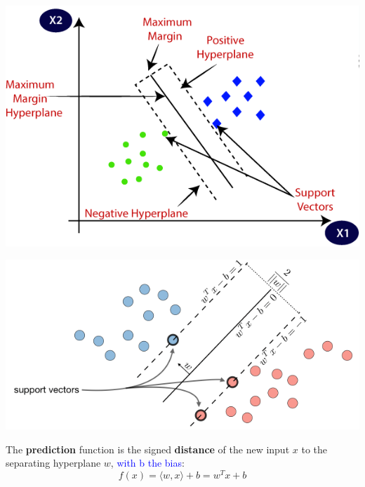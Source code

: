 \documentclass[letterpaper, 10.5pt,landscape]{article}
\begin{document}
\begin{multicols*}{3}
\vspace{-10pt}
\begin{center}
    \begin{minipage}{0.65\linewidth}
    \includegraphics[width=\textwidth]{figures/svm_figure.PNG}
    \end{minipage}
\end{center}

\vspace{-10pt}

\begin{center}
    \begin{minipage}{0.8\linewidth}
    \includegraphics[width=\textwidth]{figures/svm_figures2.PNG}
    \end{minipage}
\end{center}
\vspace{-5pt}

The \textbf{prediction} function is the signed \textbf{distance} of the new input $x$ to the separating hyperplane $w$, \textcolor{blue}{with b the bias}: 
\vspace{-5pt}
\[\boxed{f(x) = \langle w,x\rangle + b = w^{T} x + b} \] 
\vspace{-5pt}





\end{multicols*}
\end{document}
